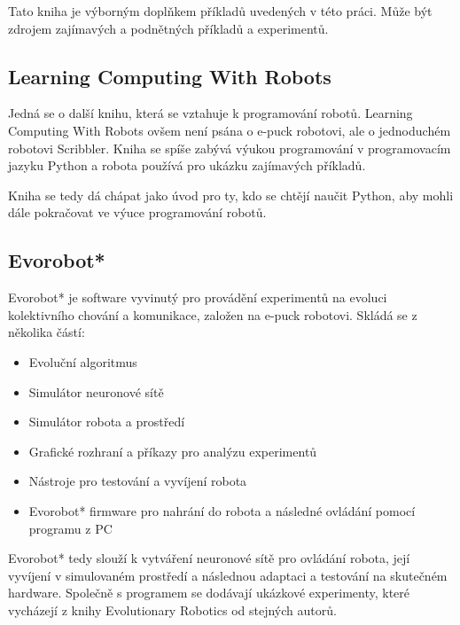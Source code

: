 \documentclass[12pt,notitlepage]{report}
\begin{document}
        Tato kniha je výborným doplňkem příkladů uvedených v této práci. Může
        být zdrojem zajímavých a podnětných příkladů a experimentů.

        \subsection{Learning Computing With Robots}
        \label{learning-computing}

        Jedná se o další knihu, která se vztahuje k programování robotů.
        Learning Computing With Robots\cite{learning} ovšem není psána o e-puck
        robotovi, ale o jednoduchém robotovi Scribbler. Kniha se spíše zabývá
        výukou programování v programovacím jazyku Python a robota používá pro
        ukázku zajímavých příkladů.

        Kniha se tedy dá chápat jako úvod pro ty, kdo se chtějí naučit Python,
        aby mohli dále pokračovat ve výuce programování robotů.

        \subsection{Evorobot*}
        \label{evorobot*}

        Evorobot* je software vyvinutý pro provádění experimentů na evoluci
        kolektivního chování a komunikace, založen na e-puck robotovi. Skládá
        se z několika částí:

        \begin{itemize}
            \item Evoluční algoritmus
            \item Simulátor neuronové sítě
            \item Simulátor robota a prostředí
            \item Grafické rozhraní a příkazy pro analýzu experimentů
            \item Nástroje pro testování a vyvíjení robota
            \item Evorobot* firmware pro nahrání do robota a následné ovládání pomocí programu z PC
        \end{itemize}

        Evorobot* tedy slouží k vytváření neuronové sítě pro ovládání robota,
        její vyvíjení v simulovaném prostředí a následnou adaptaci a testování
        na skutečném hardware. Společně s programem se dodávají ukázkové
        experimenty, které vycházejí z knihy Evolutionary
        Robotics\cite{evolutionary} od stejných autorů.
\end{document}
